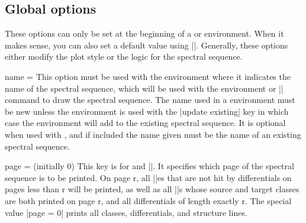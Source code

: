 \begin{sseqdata}[|| name = ex1, cohomological Serre grading]
\section{Global options}
These options can only be set at the beginning of a \sseqdataenv\space or \sseqpageenv\space environment. When it makes sense, you can also set a default value using |\sseqset|. Generally, these options either modify the plot style or the logic for the spectral sequence.
\begin{key}{name = }
This option must be used with the \sseqdataenv\space environment where it indicates the name of the spectral sequence, which will be used with the \sseqpageenv\space environment or |\printpage| command to draw the spectral sequence. The name used in a \sseqdataenv\space environment must be new unless the environment is used with the |update existing| key in which case the \sseqdataenv\space environment will add to the existing spectral sequence. It is optional when used with \sseqpageenv\space, and if included the name given must be the name of an existing spectral sequence.
\end{key}

\begin{key}{page =  (initially 0)}
This key is for \sseqpageenv\space and |\printpage|. It specifies which page of the spectral sequence is to be printed. On page r, all |\class|es that are not hit by differentials on pages less than r will be printed, as well as all |\structline|s whose source and target classes are both printed on page r, and all differentials of length exactly r. The special value |page = 0| prints all classes, differentials, and structure lines.
\end{key}

\end{sseqdata}

